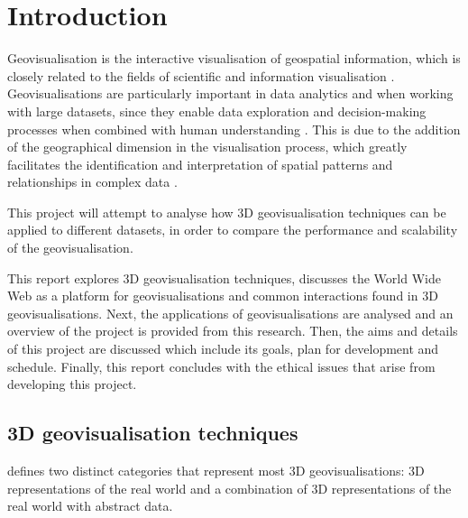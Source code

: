 \documentclass[
	fontsize=11pt
	headlines=2,
	footlines=2,
	parskip=half
]{scrartcl}
\begin{document}
	\section{Introduction} {
	\label{sec:introduction}

		Geovisualisation is the interactive visualisation of geospatial information, which is closely related to the fields of scientific and information visualisation \parencite{jiang2005geovisualization}. Geovisualisations are particularly important in data analytics and when working with large datasets, since they enable data exploration and decision-making processes when combined with human understanding \parencite{grinstein2002introduction, hendley1995case}. This is due to the addition of the geographical dimension in the visualisation process, which greatly facilitates the identification and interpretation of spatial patterns and relationships in complex data \parencite{kwan2004geovisualization}.

		This project will attempt to analyse how 3D geovisualisation techniques can be applied to different datasets, in order to compare the performance and scalability of the geovisualisation.

		
		This report explores 3D geovisualisation techniques, discusses the World Wide Web as a platform for geovisualisations and common interactions found in 3D geovisualisations. Next, the applications of geovisualisations are analysed and an overview of the project is provided from this research. Then, the aims and details of this project are discussed which include its goals, plan for development and schedule. Finally, this report concludes with the ethical issues that arise from developing this project.

		\subsection{3D geovisualisation techniques} {

			\textcite{bleisch2012geovisualization} defines two distinct categories that represent most 3D geovisualisations: 3D representations of the real world and a combination of 3D representations of the real world with abstract data.

}}
\end{document}
